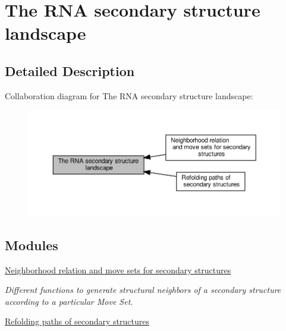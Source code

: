\hypertarget{group__landscape}{}\section{The R\+NA secondary structure landscape}
\label{group__landscape}


\subsection{Detailed Description}
Collaboration diagram for The R\+NA secondary structure landscape\+:
\nopagebreak
\begin{figure}[H]
\begin{center}
\leavevmode
\includegraphics[width=350pt]{group__landscape}
\end{center}
\end{figure}
\subsection*{Modules}
\begin{DoxyCompactItemize}
\item 
\hyperlink{group__neighbors}{Neighborhood relation and move sets for secondary structures}
\begin{DoxyCompactList}\small\item\em Different functions to generate structural neighbors of a secondary structure according to a particular Move Set. \end{DoxyCompactList}\item 
\hyperlink{group__paths}{Refolding paths of secondary structures}
\end{DoxyCompactItemize}
